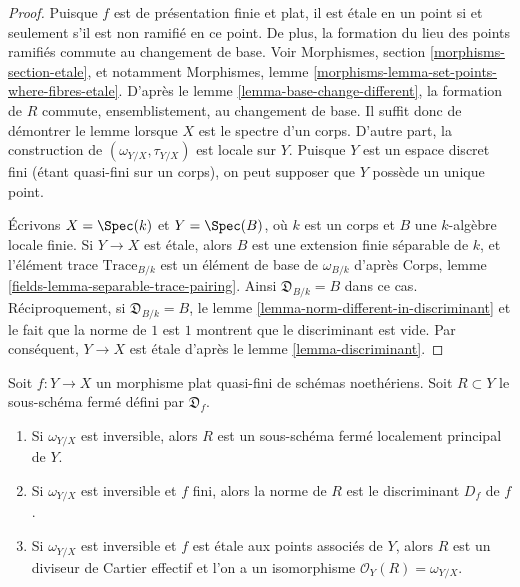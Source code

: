 \begin{proof}
Puisque $f$ est de présentation finie et plat, il est étale
en un point si et seulement s'il est non ramifié en ce point. De plus, la
formation du lieu des points ramifiés commute au changement de base.
Voir Morphismes, section \ref{morphisms-section-etale}, et notamment
Morphismes, lemme \ref{morphisms-lemma-set-points-where-fibres-etale}.
D'après le lemme \ref{lemma-base-change-different}, la formation de $R$ commute,
ensemblistement, au changement de base. Il suffit donc de démontrer le
lemme lorsque $X$ est le spectre d'un corps. D'autre part, la
construction de $(\omega_{Y/X}, \tau_{Y/X})$ est locale sur $Y$.
Puisque $Y$ est un espace discret fini (étant quasi-fini
sur un corps), on peut supposer que $Y$ possède un unique point.

\medskip\noindent
Écrivons $X = \Spec(k)$ et $Y = \Spec(B)$, où $k$ est un corps et $B$ une
$k$-algèbre locale finie. Si $Y \to X$ est étale, alors
$B$ est une extension finie séparable de $k$, et l'élément
trace $\text{Trace}_{B/k}$ est un élément de base de $\omega_{B/k}$
d'après Corps, lemme \ref{fields-lemma-separable-trace-pairing}.
Ainsi $\mathfrak{D}_{B/k} = B$ dans ce cas.
Réciproquement, si $\mathfrak{D}_{B/k} = B$, le
lemme \ref{lemma-norm-different-in-discriminant}
et le fait que la norme de $1$ est $1$ montrent que le
discriminant est vide. Par conséquent,
$Y \to X$ est étale d'après le lemme \ref{lemma-discriminant}.
\end{proof}

\begin{lemma}
\label{lemma-norm-different-is-discriminant}
Soit $f : Y \to X$ un morphisme plat quasi-fini de schémas noethériens.
Soit $R \subset Y$ le sous-schéma fermé défini par $\mathfrak{D}_f$.
\begin{enumerate}
\item Si $\omega_{Y/X}$ est inversible,
alors $R$ est un sous-schéma fermé localement principal de $Y$.
\item Si $\omega_{Y/X}$ est inversible et $f$ fini, alors
la norme de $R$ est le discriminant $D_f$ de $f$.
\item Si $\omega_{Y/X}$ est inversible et $f$
est étale aux points associés de $Y$, alors $R$
est un diviseur de Cartier effectif et l'on a un
isomorphisme $\mathcal{O}_Y(R) = \omega_{Y/X}$.
\end{enumerate}
\end{lemma}

